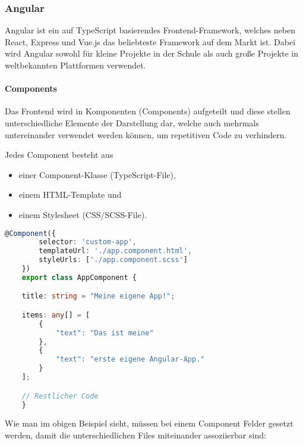 \subsubsection{Angular}

Angular ist ein auf TypeScript basierendes Frontend-Framework, welches neben React, Express und Vue.js das beliebteste Framework auf dem Markt ist. \cite{SFT} Dabei wird Angular sowohl für kleine Projekte in der Schule als auch große Projekte in weltbekannten Plattformen verwendet.

\paragraph{Components}

Das Frontend wird in Komponenten (Components) aufgeteilt und diese stellen unterschiedliche Elemente der Darstellung dar, welche auch mehrmals untereinander verwendet werden können, um repetitiven Code zu verhindern.

Jedes Component besteht aus

\begin{itemize}
    \item einer Component-Klasse (TypeScript-File),
    \item einem HTML-Template und
    \item einem Stylesheet (CSS/SCSS-File).
\end{itemize}

\begin{lstlisting}[language=TypeScript,caption={Beispiel eines Angular-Components}]
    @Component({
        selector: 'custom-app',
        templateUrl: './app.component.html',
        styleUrls: ['./app.component.scss']
    })
    export class AppComponent {

    title: string = "Meine eigene App!";

    items: any[] = [
        {
            "text": "Das ist meine"
        },
        {
            "text": "erste eigene Angular-App."
        }
    ];

    // Restlicher Code
    }
\end{lstlisting}

Wie man im obigen Beispiel sieht, müssen bei einem Component Felder gesetzt werden, damit die unterschiedlichen Files miteinander assoziierbar sind:

